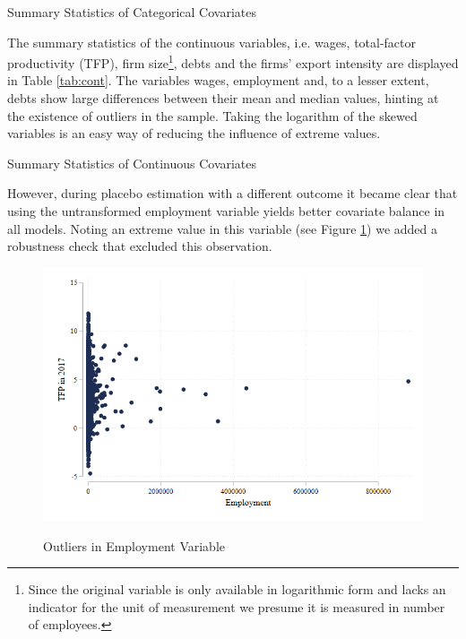 \documentclass[a4paper,11pt]{scrartcl}
\begin{document}
\begin{table}[h]
	\centering
	\caption{Summary Statistics of Categorical Covariates} 
	
	\label{tab:cat}	
\end{table}

The summary statistics of the continuous variables, i.e. wages,  total-factor productivity (TFP), firm size\footnote{Since the original variable is only available in logarithmic form and lacks an indicator for the unit of measurement we presume it is measured in number of employees.}, debts and the firms' export intensity are displayed in Table \ref{tab:cont}. The variables wages, employment and, to a lesser extent, debts show large differences between their mean and median values, hinting at the existence of outliers in the sample. Taking the logarithm of the skewed variables is an easy way of reducing the influence of extreme values. 

\begin{table}[h]
	\centering
	\caption{Summary Statistics of Continuous Covariates} 
	
	\label{tab:cont}
\end{table}

However, during placebo estimation with a different outcome it became clear that using the untransformed employment variable yields better covariate balance in all models. Noting an extreme value in this variable (see Figure \ref{fig:outliers}) we added a robustness check that excluded this observation. 
 

\begin{figure}[h]\centering
	\caption{Outliers in Employment Variable}
	\includegraphics[width=\textwidth]{emp15_outliers}
  	\label{fig:outliers}
\end{figure} 
\end{document}
